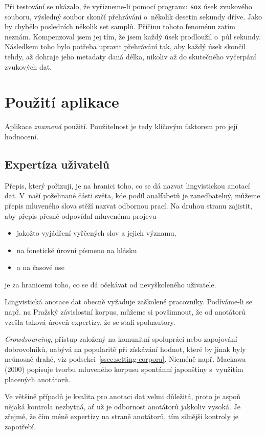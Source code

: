 Při testování se ukázalo, že vyřízneme-li pomocí programu \texttt{sox} úsek
zvukového souboru, výsledný soubor skončí přehrávání o~několik desetin sekundy
dříve. Jako by chybělo posledních několik set samplů. Příčinu tohoto fenoménu
zatím neznám. Kompenzoval jsem jej tím, že jsem každý úsek prodloužil o~půl
sekundy. Následkem toho bylo potřeba upravit přehrávání tak, aby každý úsek
skončil tehdy, až dohraje jeho metadaty daná délka, nikoliv až do skutečného
vyčerpání zvukových dat.


\section{Použití aplikace}

Aplikace {\em znamená} použití. Použitelnost je tedy klíčovým faktorem pro její hodnocení.

\subsection{Expertíza uživatelů}

Přepis, který pořizuji, je na hranici toho, co se dá nazvat lingvistickou
anotací dat. V~naší požehnané části světa, kde podíl analfabetů je zanedbatelný,
můžeme přepis mluveného slova stěží nazvat odbornou prací. Na druhou stranu zajistit, aby
přepis přesně odpovídal mluvenému projevu
\begin{itemize}
\item{jakožto vyjádření vyřčených slov a jejich významu,}
\item{na fonetické úrovni písmeno na hlásku}
\item{a na časové ose}
\end{itemize}
je za hranicemi toho, co se dá očekávat od nevyškoleného uživatele.

Lingvistická anotace dat obecně vyžaduje zaškolené pracovníky. Podíváme-li se
např. na Pražský závislostní korpus, můžeme si povšimnout, že od anotátorů
vzešla taková úroveň expertízy, že se stali spoluautory\cite{hajivc2005complex}.

{\em Crowdsourcing}, přístup založený na komunitní spolupráci nebo zapojování
dobrovolníků, nabývá na popularitě při získávání hodnot, které by jinak byly
neúnosně drahé, viz podsekci~\ref{ssec:setting-corpora}. Nicméně např.
Maekawa (2000)\cite{maekawa2000spontaneous} popisuje tvorbu
mluveného korpusu spontánní japonštiny s~využitím placených anotátorů.

Ve většině případů je kvalita pro anotaci dat velmi důležitá, proto je aspoň
nějaká kontrola nezbytná, ať už je odbornost anotátorů jakkoliv vysoká. Je
zřejmé, že čím méně expertízy na straně anotátorů, tím silnější kontroly je
zapotřebí.

